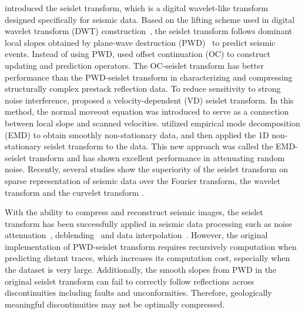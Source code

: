    \cite{fomel2010seislet} introduced the seislet transform, which is a digital 
    wavelet-like transform designed specifically for seismic data. 
    Based on the lifting scheme used in digital wavelet transform (DWT) 
    construction~\cite[]{sweldens1995lifting}, the seislet transform follows 
    dominant local slopes obtained by plane-wave destruction 
    (PWD)~\cite[]{claerbout2000basic, fomel2002applications} to predict seismic 
    events. 
    Instead of using PWD, \cite{liu2010oc} used offset continuation (OC) to 
    construct updating and prediction operators. 
    The OC-seislet transform has better performance than the PWD-seislet 
    transform in characterizing and compressing structurally complex prestack 
    reflection data. 
    To reduce sensitivity to strong noise interference, \cite{liu2015signal} 
    proposed a velocity-dependent (VD) seislet transform. 
    In this method, the normal moveout equation was introduced to serve as a 
    connection between local slope and scanned velocities. 
    \cite{chen2018emd} utilized empirical mode decomposition (EMD) to obtain 
    smoothly non-stationary data, and then applied the 1D non-stationary seislet 
    transform to the data. This new approach was called the EMD-seislet 
    transform and has shown excellent performance in attenuating random noise. 
    Recently, several studies show the superiority of the seislet transform
    on sparse representation of seismic data over the Fourier transform, the 
    wavelet transform and the curvelet transform \cite[]{fomel2010seislet, 
    gan2015dealiased, chen2018emd}.

    With the ability to compress and reconstruct seismic images, the 
    seislet transform has been successfully applied in seismic data processing 
    such as noise attenuation~\cite[]{chen2016dip, chen2016double}, 
    deblending~\cite[]{chen2014iterative, gan2016simultaneous} and data 
    interpolation~\cite[]{liu2013iterative, gan2016simultaneous}.
    However, the original implementation of PWD-seislet transform requires
    recursively computation when predicting distant traces, which increases its 
    computation cost, especially when the dataset is very large.
    Additionally, the smooth slopes from PWD in the original seislet transform 
    can fail to correctly follow reflections across discontinuities including 
    faults and unconformities. 
    Therefore, geologically meaningful discontinuities may not be optimally 
    compressed. 

